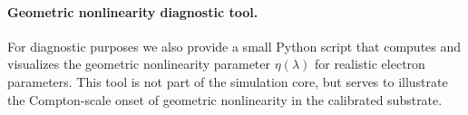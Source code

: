 \paragraph{Geometric nonlinearity diagnostic tool.}
For diagnostic purposes we also provide a small Python script that
computes and visualizes the geometric nonlinearity parameter $\eta(\lambda)$
for realistic electron parameters. This tool is not part of the simulation
core, but serves to illustrate the Compton-scale onset of geometric
nonlinearity in the calibrated substrate.
